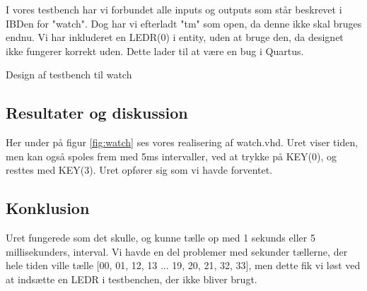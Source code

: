 \documentclass[../journal.tex]{subfiles}
\begin{document}
I vores testbench har vi forbundet alle inputs og outputs som står beskrevet i IBDen for "watch". Dog har vi efterladt "tm" som open, da denne ikke skal bruges endnu. Vi har inkluderet en LEDR(0) i entity, uden at bruge den, da designet ikke fungerer korrekt uden. Dette lader til at være en bug i Quartus.

\begin{table}[H]
    \centering
      \framebox{
        \rule{8pt}{0pt}
          
  }
  \caption{Design af testbench til watch}	
  \label{src:watch_test}

\end{table}

\subsection{Resultater og diskussion}

Her under på figur \ref{fig:watch} ses vores realisering af watch.vhd. Uret viser tiden, men kan også spoles frem med 5ms intervaller, ved at trykke på KEY(0), og resttes med KEY(3). Uret opfører sig som vi havde forventet.


\subsection{Konklusion}

Uret fungerede som det skulle, og kunne tælle op med 1 sekunds eller 5 millisekunders, interval. Vi havde en del problemer med sekunder tællerne, der hele tiden ville tælle [00, 01, 12, 13 ... 19, 20, 21, 32, 33], men dette fik vi løst ved at indsætte en LEDR i testbenchen, der ikke bliver brugt.
\end{document}
